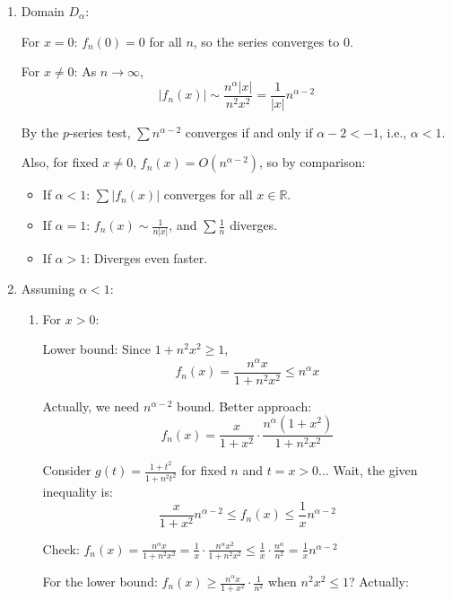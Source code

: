 \documentclass[12pt]{article}
\begin{document}
\begin{answerbox}
\begin{enumerate}
    \item Domain $D_\alpha$:
    
    For $x = 0$: $f_n(0) = 0$ for all $n$, so the series converges to 0.
    
    For $x \neq 0$: As $n \to \infty$,
    \[
    |f_n(x)| \sim \frac{n^\alpha |x|}{n^2 x^2} = \frac{1}{|x|} n^{\alpha-2}
    \]
    
    By the $p$-series test, $\sum n^{\alpha-2}$ converges if and only if $\alpha-2 < -1$, i.e., $\alpha < 1$.
    
    Also, for fixed $x \neq 0$, $f_n(x) = O(n^{\alpha-2})$, so by comparison:
    
    \begin{itemize}
        \item If $\alpha < 1$: $\sum |f_n(x)|$ converges for all $x \in \mathbb{R}$.
        \item If $\alpha = 1$: $f_n(x) \sim \frac{1}{n|x|}$, and $\sum \frac{1}{n}$ diverges.
        \item If $\alpha > 1$: Diverges even faster.
    \end{itemize}
    
    \item Assuming $\alpha < 1$:
    
    \begin{enumerate}
        \item For $x > 0$:
        
        Lower bound: Since $1 + n^2 x^2 \geq 1$,
        \[
        f_n(x) = \frac{n^\alpha x}{1 + n^{2} x^2} \leq n^\alpha x
        \]
        
        Actually, we need $n^{\alpha-2}$ bound. Better approach:
        \[
        f_n(x) = \frac{x}{1+x^2} \cdot \frac{n^\alpha (1+x^2)}{1+n^2 x^2}
        \]
        
        Consider $g(t) = \frac{1+t^2}{1+n^2 t^2}$ for fixed $n$ and $t=x>0$... Wait, the given inequality is:
        \[
        \frac{x}{1+x^2} n^{\alpha-2} \leq f_n(x) \leq \frac{1}{x} n^{\alpha-2}
        \]
        
        Check: $f_n(x) = \frac{n^\alpha x}{1+n^2 x^2} = \frac{1}{x} \cdot \frac{n^\alpha x^2}{1+n^2 x^2} \leq \frac{1}{x} \cdot \frac{n^\alpha}{n^2} = \frac{1}{x} n^{\alpha-2}$
        
        For the lower bound: $f_n(x) \geq \frac{n^\alpha x}{1+x^2} \cdot \frac{1}{n^2}$ when $n^2 x^2 \leq 1$? Actually:
        

\end{enumerate}
\end{enumerate}
\end{answerbox}
\end{document}
